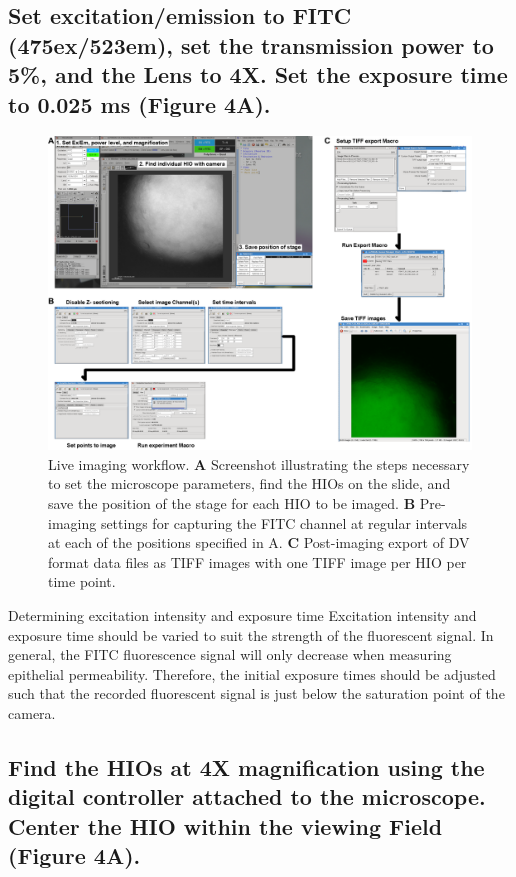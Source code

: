 \documentclass[11pt]{article}
\begin{document}
\subsection{{\sffamily } Set excitation/emission to FITC (475ex/523em), set the transmission power to 5\%, and the Lens to 4X. Set the exposure time to 0.025 ms (\textbf{Figure 4A}).}
\label{sec:orgheadline62}
\begin{figure}[h]
\centering
\includegraphics[width=0.95\linewidth]{./img/figure4.pdf}
\caption{Live imaging workflow. \textbf{A} Screenshot illustrating the steps necessary to set the microscope parameters, find the HIOs on the slide, and save the position of the stage for each HIO to be imaged. \textbf{B} Pre-imaging settings for capturing the FITC channel at regular intervals at each of the positions specified in A. \textbf{C} Post-imaging export of DV format data files as TIFF images with one TIFF image per HIO per time point.}
\end{figure}
\begin{bclogo}[logo=\bcinfo, couleurBarre=Black, noborder=true, couleur=gray!10]{     Determining excitation intensity and exposure time}
Excitation intensity and exposure time should be varied to suit the strength of the fluorescent signal. In general, the FITC fluorescence signal will only decrease when measuring epithelial permeability. Therefore, the initial exposure times should be adjusted such that the recorded fluorescent signal is just below the saturation point of the camera.\\
\end{bclogo}
\subsection{{\sffamily } Find the HIOs at 4X magnification using the digital controller attached to the microscope. Center the HIO within the viewing Field (\textbf{Figure 4A}).}
\label{sec:orgheadline63}
\end{document}
